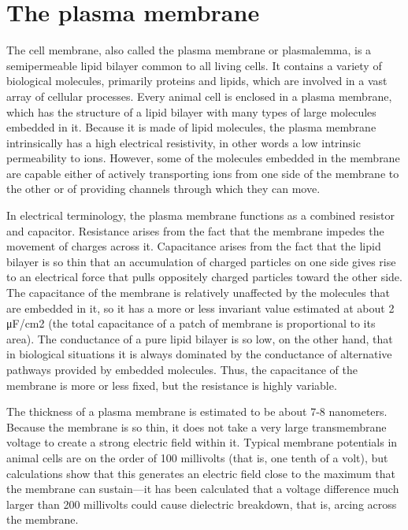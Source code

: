 \documentclass[]{book}
\begin{document}
\hypertarget{the-plasma-membrane}{%
\section{The plasma membrane}\label{the-plasma-membrane}}

The cell membrane, also called the plasma membrane or plasmalemma, is a semipermeable lipid bilayer common to all living cells. It contains a variety of biological molecules, primarily proteins and lipids, which are involved in a vast array of cellular processes.
Every animal cell is enclosed in a plasma membrane, which has the structure of a lipid bilayer with many types of large molecules embedded in it. Because it is made of lipid molecules, the plasma membrane intrinsically has a high electrical resistivity, in other words a low intrinsic permeability to ions. However, some of the molecules embedded in the membrane are capable either of actively transporting ions from one side of the membrane to the other or of providing channels through which they can move.

In electrical terminology, the plasma membrane functions as a combined resistor and capacitor. Resistance arises from the fact that the membrane impedes the movement of charges across it. Capacitance arises from the fact that the lipid bilayer is so thin that an accumulation of charged particles on one side gives rise to an electrical force that pulls oppositely charged particles toward the other side. The capacitance of the membrane is relatively unaffected by the molecules that are embedded in it, so it has a more or less invariant value estimated at about 2 μF/cm2 (the total capacitance of a patch of membrane is proportional to its area). The conductance of a pure lipid bilayer is so low, on the other hand, that in biological situations it is always dominated by the conductance of alternative pathways provided by embedded molecules. Thus, the capacitance of the membrane is more or less fixed, but the resistance is highly variable.

The thickness of a plasma membrane is estimated to be about 7-8 nanometers. Because the membrane is so thin, it does not take a very large transmembrane voltage to create a strong electric field within it. Typical membrane potentials in animal cells are on the order of 100 millivolts (that is, one tenth of a volt), but calculations show that this generates an electric field close to the maximum that the membrane can sustain---it has been calculated that a voltage difference much larger than 200 millivolts could cause dielectric breakdown, that is, arcing across the membrane.
\end{document}
